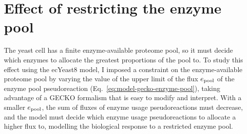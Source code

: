 \section{Effect of restricting the enzyme pool}
\label{sec:model-pool}

The yeast cell has a finite enzyme-available proteome pool, so it must decide which enzymes to allocate the greatest proportions of the pool to.
To study this effect using the ecYeast8 model, I imposed a constraint on the enzyme-available proteome pool by varying the value of the upper limit of the flux $e_{\mathrm{pool}}$ of the enzyme pool pseudoreaction (Eq.\ \ref{eq:model-gecko-enzyme-pool}), taking advantage of a GECKO formalism that is easy to modify and interpret.
With a smaller $e_{\mathrm{pool}}$, the sum of fluxes of enzyme usage pseudoreactions must decrease, and the model must decide which enzyme usage pseudoreactions to allocate a higher flux to, modelling the biological response to a restricted enzyme pool.

